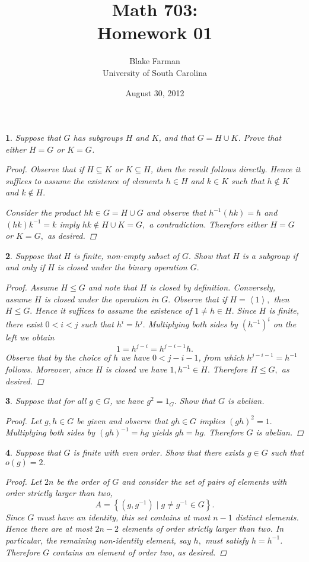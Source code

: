 \documentclass[10pt]{amsart}
\author{Blake Farman\\University of South Carolina}
\title{Math 703:\\Homework 01}
\date{August 30, 2012}
\begin{document}
\maketitle

\newtheorem{thm}{}
\begin{thm}
	Suppose that $G$ has subgroups $H$ and $K$, and that $G = H \cup K$.  Prove that either $H = G$ or $K = G$.
	\begin{proof}
		Observe that if $H \subseteq K$ or $K \subseteq H$, then the result follows directly.
		Hence it suffices to assume the existence of elements $h \in H$ and $k \in K$ such that $h \not\in K$ and $k \not\in H.$
		
		Consider the product $hk \in G = H \cup G$ and observe that $h^{-1}(hk) = h$ and $(hk)k^{-1} = k$ imply $hk \not\in H \cup K = G,$ a contradiction.  Therefore either $H = G$ or $K = G,$ as desired.
	\end{proof}
\end{thm}

\begin{thm}
	Suppose that $H$ is finite, non-empty subset of $G.$  Show that $H$ is a subgroup if and only if $H$ is closed under the  binary operation $G.$
	\begin{proof}
	Assume $H \leq G$ and note that $H$ is closed by definition.  
	Conversely, assume $H$ is closed under the operation in $G.$
	Observe that if $H = \left< 1 \right> ,$ then $H \leq G.$
	Hence it suffices to assume the existence of $1 \not = h \in H.$  
	Since $H$ is finite, there exist $0< i < j$ such that $h^i = h^j.$  
	Multiplying both sides by $(h^{-1})^i$ on the left we obtain
		$$1 = h^{j-i} = h^{j-i-1}h.$$
	Observe that by the choice of $h$ we have $0 < j-i-1$, from which $h^{j-i-1} = h^{-1}$ follows.  
	Moreover, since $H$ is closed we have $1, h^{-1} \in H.$  
	Therefore $H \leq G,$ as desired.
	\end{proof}
\end{thm}

\begin{thm}
	Suppose that for all $g \in G$, we have $g^2 = 1_G.$  Show that $G$ is abelian.
	\begin{proof}
	Let $g,h \in G$ be given and observe that $gh \in G$ implies $(gh)^2 = 1.$  
	Multiplying both sides by $(gh)^{-1} = hg$ yields $gh = hg.$ 
	Therefore $G$ is abelian.
	\end{proof}
\end{thm}

\begin{thm}
	Suppose that $G$ is finite with even order.  Show that there exists $g \in G$ such that $o(g) = 2.$
	\begin{proof}
	Let $2n$ be the order of $G$ and consider the set of pairs of elements with order strictly larger than two, 
		$$A = \left\{ (g,g^{-1}) \mid g \not = g^{-1} \in G \right\}.$$
	Since $G$ must have an identity, this set contains at most $n - 1$ distinct elements. 
	Hence there are at most $2n-2$ elements of order strictly larger than two.
	In particular, the remaining non-identity element, say $h,$ must satisfy $h = h^{-1}$.
	Therefore $G$ contains an element of order two, as desired.
	\end{proof}
\end{thm}
\end{document}
